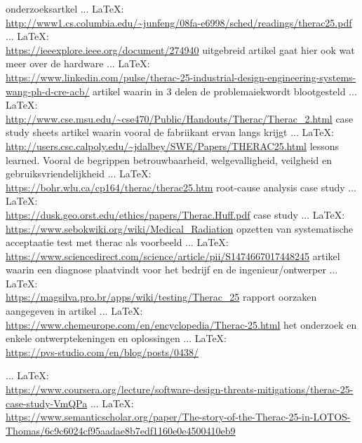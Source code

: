 \begin{thebibliography}{99}
{{{{onderzoeksartkel
 ... \LaTeX:\\ \url{http://www1.cs.columbia.edu/~junfeng/08fa-e6998/sched/readings/therac25.pdf}
 ... \LaTeX:\\ \url{https://ieeexplore.ieee.org/document/274940}
uitgebreid artikel gaat hier ook wat meer over de hardware
 ... \LaTeX:\\ \url{https://www.linkedin.com/pulse/therac-25-industrial-design-engineering-systems-wang-ph-d-cre-acb/}
artikel waarin in 3 delen de problemaiekwordt blootgesteld
 ... \LaTeX:\\ \url{http://www.cse.msu.edu/~cse470/Public/Handouts/Therac/Therac_2.html}
case study sheets
artikel waarin vooral de fabriikant ervan langs krijgt
 ... \LaTeX:\\ \url{http://users.csc.calpoly.edu/~jdalbey/SWE/Papers/THERAC25.html}
lessons learned. Vooral de begrippen betrouwbaarheid, welgevalligheid, veilgheid en gebruiksvriendelijkheid
 ... \LaTeX:\\ \url{https://bohr.wlu.ca/cp164/therac/therac25.htm}
root-cause analysis
case study
 ... \LaTeX:\\ \url{https://dusk.geo.orst.edu/ethics/papers/Therac.Huff.pdf}
case study
 ... \LaTeX:\\ \url{https://www.sebokwiki.org/wiki/Medical_Radiation}
opzetten van systematische acceptaatie test met therac als voorbeeld
 ... \LaTeX:\\ \url{https://www.sciencedirect.com/science/article/pii/S1474667017448245}
artikel waarin een diagnose plaatvindt voor het bedrijf en de ingenieur/ontwerper
 ... \LaTeX:\\ \url{https://magsilva.pro.br/apps/wiki/testing/Therac_25}
rapport
oorzaken aangegeven in artikel
 ... \LaTeX:\\ \url{https://www.chemeurope.com/en/encyclopedia/Therac-25.html}
het onderzoek en enkele ontwerptekeningen en oplossingen
 ... \LaTeX:\\ \url{https://pvs-studio.com/en/blog/posts/0438/}

 ... \LaTeX:\\ \url{https://www.coursera.org/lecture/software-design-threats-mitigations/therac-25-case-study-VmQPa}
 ... \LaTeX:\\ \url{https://www.semanticscholar.org/paper/The-story-of-the-Therac-25-in-LOTOS-Thomas/6c9c6024cf95aadae8b7edf1160e0e4500410eb9}

}}}}
\end{thebibliography}
